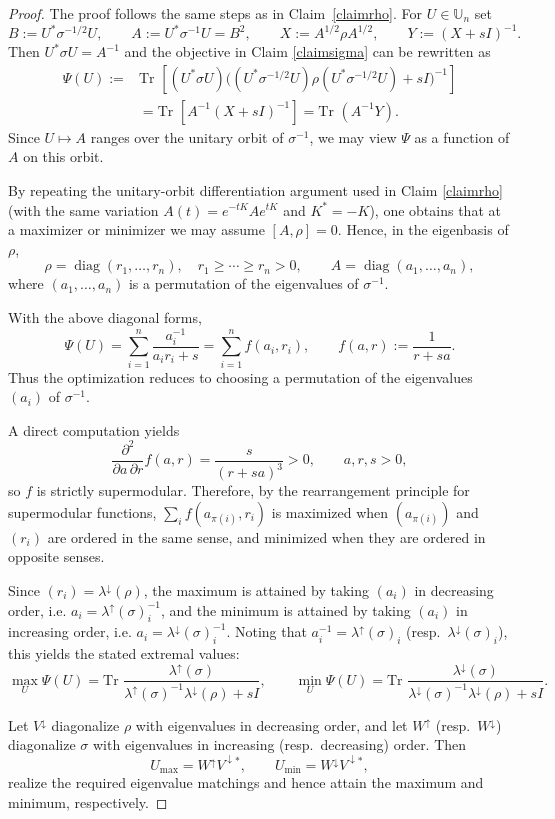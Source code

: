 \documentclass[10pt,reqno]{amsart}
\theoremstyle{break-italic}
\theoremstyle{break-italic}
\theoremstyle{break-italic}
\theoremstyle{break-italic}
\theoremstyle{break-italic}
\theoremstyle{break-italic}
\theoremstyle{break-italic}
\theoremstyle{break-italic}
\theoremstyle{break-roman}
\theoremstyle{standard}
\theoremstyle{varthm-roman}
\theoremstyle{varthm-italic}
\theoremstyle{varthm-roman-break}
\theoremstyle{varthm-italic-break}
\theoremstyle{varthm-roman-no-punctuation}
\theoremstyle{varthm-italic-no-punctuation}
\numberwithin{equation}{section}
\def\Tr{\text{Tr }}
\begin{document}
\begin{proof}
The proof follows the same steps as in Claim~\ref{claimrho}. For
$U\in\mathbb U_n$ set
\[
B:=U^*\sigma^{-1/2}U,\qquad A:=U^*\sigma^{-1}U=B^2,
\qquad X:=A^{1/2}\rho A^{1/2},\qquad Y:=(X+sI)^{-1}.
\]
Then $U^*\sigma U=A^{-1}$ and the objective in Claim \ref{claimsigma} can be rewritten as
\begin{align*}
\Psi(U):=&\Tr\!\left[(U^*\sigma U)\big((U^*\sigma^{-1/2}U)\rho(U^*\sigma^{-1/2}U)+sI\big)^{-1}\right]\\
&=\Tr\!\left[A^{-1}(X+sI)^{-1}\right]=\Tr(A^{-1}Y).
\end{align*}
Since $U\mapsto A$ ranges over the unitary orbit of $\sigma^{-1}$, we may view
$\Psi$ as a function of $A$ on this orbit.

By repeating the unitary-orbit differentiation argument used in Claim \ref{claimrho}
(with the same variation $A(t)=e^{-tK}Ae^{tK}$ and $K^*=-K$), one obtains that at
a maximizer or minimizer we may assume $[A,\rho]=0$. Hence, in the eigenbasis of
$\rho$,
\[
\rho=\operatorname{diag}(r_1,\dots,r_n),\quad r_1\ge\cdots\ge r_n>0,
\qquad
A=\operatorname{diag}(a_1,\dots,a_n),
\]
where $(a_1,\dots,a_n)$ is a permutation of the eigenvalues of $\sigma^{-1}$.

With the above diagonal forms,
\[
\Psi(U)=\sum_{i=1}^n \frac{a_i^{-1}}{a_ir_i+s}
=\sum_{i=1}^n f(a_i,r_i),
\qquad
f(a,r):=\frac{1}{r+sa}.
\]
Thus the optimization reduces to choosing a permutation of the eigenvalues
$(a_i)$ of $\sigma^{-1}$.

A direct computation yields
\[
\frac{\partial^2}{\partial a\,\partial r}f(a,r)
=
\frac{s}{(r+sa)^3}>0,
\qquad a,r,s>0,
\]
so $f$ is strictly supermodular. Therefore, by the rearrangement principle for
supermodular functions, $\sum_i f(a_{\pi(i)},r_i)$ is maximized when
$(a_{\pi(i)})$ and $(r_i)$ are ordered in the same sense, and minimized when
they are ordered in opposite senses.

Since $(r_i)=\lambda^\downarrow(\rho)$, the maximum is attained by taking
$(a_i)$ in decreasing order, i.e. $a_i=\lambda^\uparrow(\sigma)^{-1}_i$, and the
minimum is attained by taking $(a_i)$ in increasing order, i.e.
$a_i=\lambda^\downarrow(\sigma)^{-1}_i$. Noting that
$a_i^{-1}=\lambda^\uparrow(\sigma)_i$ (resp.\ $\lambda^\downarrow(\sigma)_i$),
this yields the stated extremal values:
\[
\max_U \Psi(U)=\Tr\frac{\lambda^\uparrow(\sigma)}{\lambda^\uparrow(\sigma)^{-1}\lambda^\downarrow(\rho)+sI},
\qquad
\min_U \Psi(U)=\Tr\frac{\lambda^\downarrow(\sigma)}{\lambda^\downarrow(\sigma)^{-1}\lambda^\downarrow(\rho)+sI}.
\]

Let $V^\downarrow$ diagonalize $\rho$ with eigenvalues in decreasing order, and
let $W^\uparrow$ (resp.\ $W^\downarrow$) diagonalize $\sigma$ with eigenvalues in
increasing (resp.\ decreasing) order. Then
\[
U_{\max}=W^\uparrow V^{\downarrow*},
\qquad
U_{\min}=W^\downarrow V^{\downarrow*},
\]
realize the required eigenvalue matchings and hence attain the maximum and
minimum, respectively.
\end{proof}
\end{document}
